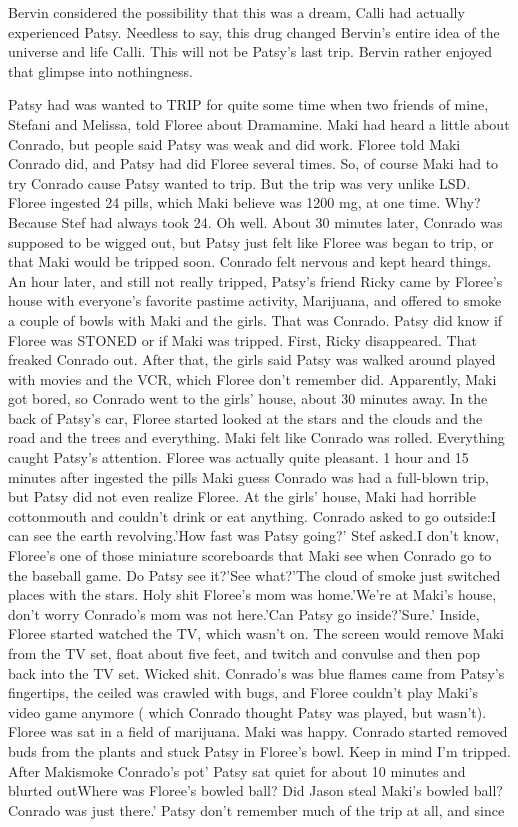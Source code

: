 \documentclass[12pt]{book}
\begin{document}
Bervin considered the possibility that this was a dream, Calli had actually experienced Patsy. Needless to say, this drug changed Bervin's entire idea of the universe and life Calli. This will not be Patsy's last trip. Bervin rather enjoyed that glimpse into nothingness.



Patsy had was wanted to TRIP for quite some time when two friends of mine, Stefani and Melissa, told Floree about Dramamine. Maki had heard a little about Conrado, but people said Patsy was weak and did work. Floree told Maki Conrado did, and Patsy had did Floree several times. So, of course Maki had to try Conrado cause Patsy wanted to trip. But the trip was very unlike LSD. Floree ingested 24 pills, which Maki believe was 1200 mg, at one time. Why? Because Stef had always took 24. Oh well. About 30 minutes later, Conrado was supposed to be wigged out, but Patsy just felt like Floree was began to trip, or that Maki would be tripped soon. Conrado felt nervous and kept heard things. An hour later, and still not really tripped, Patsy's friend Ricky came by Floree's house with everyone's favorite pastime activity, Marijuana, and offered to smoke a couple of bowls with Maki and the girls. That was Conrado. Patsy did know if Floree was STONED or if Maki was tripped. First, Ricky disappeared. That freaked Conrado out. After that, the girls said Patsy was walked around played with movies and the VCR, which Floree don't remember did. Apparently, Maki got bored, so Conrado went to the girls' house, about 30 minutes away. In the back of Patsy's car, Floree started looked at the stars and the clouds and the road and the trees and everything. Maki felt like Conrado was rolled. Everything caught Patsy's attention. Floree was actually quite pleasant. 1 hour and 15 minutes after ingested the pills Maki guess Conrado was had a full-blown trip, but Patsy did not even realize Floree. At the girls' house, Maki had horrible cottonmouth and couldn't drink or eat anything. Conrado asked to go outside:I can see the earth revolving.'How fast was Patsy going?' Stef asked.I don't know, Floree's one of those miniature scoreboards that Maki see when Conrado go to the baseball game. Do Patsy see it?'See what?'The cloud of smoke just switched places with the stars. Holy shit Floree's mom was home.'We're at Maki's house, don't worry Conrado's mom was not here.'Can Patsy go inside?'Sure.' Inside, Floree started watched the TV, which wasn't on. The screen would remove Maki from the TV set, float about five feet, and twitch and convulse and then pop back into the TV set. Wicked shit. Conrado's was blue flames came from Patsy's fingertips, the ceiled was crawled with bugs, and Floree couldn't play Maki's video game anymore ( which Conrado thought Patsy was played, but wasn't). Floree was sat in a field of marijuana. Maki was happy. Conrado started removed buds from the plants and stuck Patsy in Floree's bowl. Keep in mind I'm tripped. After Makismoke Conrado's pot' Patsy sat quiet for about 10 minutes and blurted outWhere was Floree's bowled ball? Did Jason steal Maki's bowled ball? Conrado was just there.' Patsy don't remember much of the trip at all, and since 
\end{document}
